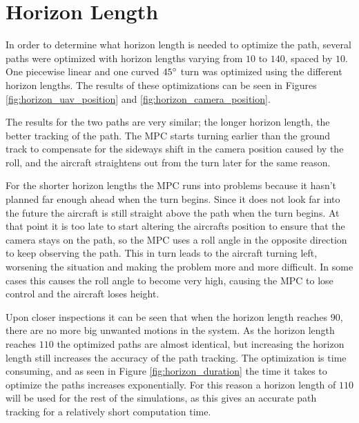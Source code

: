 \section{Horizon Length}

In order to determine what horizon length is needed to optimize the path, several paths were optimized with horizon lengths varying from $10$ to $140$, spaced by $10$. One piecewise linear and one curved $45\degree$ turn was optimized using the different horizon lengths. The results of these optimizations can be seen in Figures \ref{fig:horizon_uav_position} and \ref{fig:horizon_camera_position}.

The results for the two paths are very similar; the longer horizon length, the better tracking of the path. The MPC starts turning earlier than the ground track to compensate for the sideways shift in the camera position caused by the roll, and the aircraft straightens out from the turn later for the same reason.

For the shorter horizon lengths the MPC runs into problems because it hasn't planned far enough ahead when the turn begins. Since it does not look far into the future the aircraft is still straight above the path when the turn begins. At that point it is too late to start altering the aircrafts position to ensure that the camera stays on the path, so the MPC uses a roll angle in the opposite direction to keep observing the path. This in turn leads to the aircraft turning left, worsening the situation and making the problem more and more difficult. In some cases this causes the roll angle to become very high, causing the MPC to lose control and the aircraft loses height.

Upon closer inspections it can be seen that when the horizon length reaches $90$, there are no more big unwanted motions in the system. As the horizon length reaches $110$ the optimized paths are almost identical, but increasing the horizon length still increases the accuracy of the path tracking. The optimization is time consuming, and as seen in Figure \ref{fig:horizon_duration} the time it takes to optimize the paths increases exponentially. For this reason a horizon length of $110$ will be used for the rest of the simulations, as this gives an accurate path tracking for a relatively short computation time.


